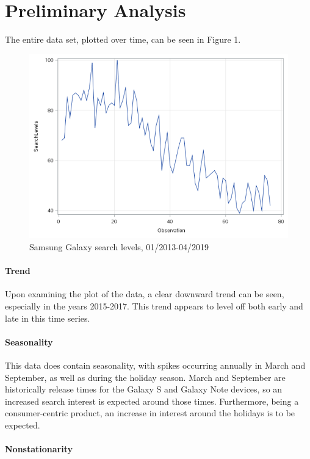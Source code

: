\documentclass[12pt]{article}
\begin{document}
	\section{Preliminary Analysis}
	
	The entire data set, plotted over time, can be seen in Figure 1.
	
\begin{figure}
		\includegraphics[scale=.7]{All_Plot.png}
		\caption{Samsung Galaxy search levels, 01/2013-04/2019}
\end{figure}

	
\paragraph{Trend}

	Upon examining the plot of the data, a clear downward trend can be seen, especially in the years 2015-2017.  This trend appears to level off both early and late in this time series.

\paragraph{Seasonality}

	This data does contain seasonality, with spikes occurring annually in March and September, as well as during the holiday season.  March and September are historically release times for the Galaxy S and Galaxy Note devices, so an increased search interest is expected around those times.  Furthermore, being a consumer-centric product, an increase in interest around the holidays is to be expected.

\paragraph{Nonstationarity}
	
\end{document}
